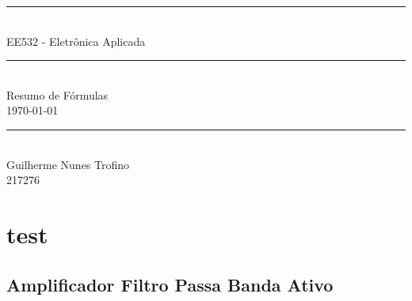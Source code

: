 \documentclass{article}
\begin{document}
    \begin{titlepage}
        \begin{center}
            \rule{450pt}{0.5pt}\\[4mm]
            {\Huge EE532 - Eletrônica Aplicada}\\
            \rule{450pt}{0.5pt}\\[2mm]
            {\Large Resumo de Fórmulas}\\[200mm]
            \today\\
            \rule{250pt}{0.5pt}\\
            {\large Guilherme Nunes Trofino}\\
            {\large 217276}\\
        \end{center}
    \end{titlepage}
\newpage

    \section{test}
    \subsection{Amplificador Filtro Passa Banda Ativo}
\end{document}
